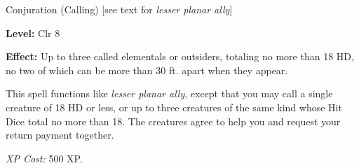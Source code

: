 \label{spell:Greater Planar Ally}

Conjuration (Calling) [see text for \textit{lesser planar ally}]

\textbf{Level:} Clr 8

\textbf{Effect:} Up to three called elementals or outsiders, totaling no more than 
18 HD, no two of which can be more than 30 ft. apart when they appear.

This spell functions like \textit{lesser planar ally}, except that you may call 
a single creature of 18 HD or less, or up to three creatures of the same kind whose 
Hit Dice total no more than 18. The creatures agree to help you and request your 
return payment together.

\textit{XP Cost:} 500 XP.

